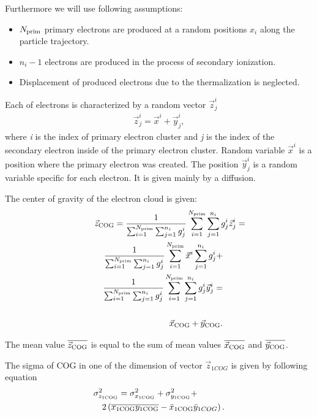 \documentclass[a4paper,12pt]{article}
\begin{document}
Furthermore we will use following  assumptions:
\begin{itemize}
\item $N_{\rm{prim}}$ primary electrons  are produced at a random
positions $x_i$ along the particle trajectory. \item $n_i-1$
electrons are produced in the process of secondary ionization.
\item Displacement of produced electrons due to the thermalization
is neglected.
\end{itemize}

Each of electrons is characterized by a random vector
$\vec{z}^i_j$
\begin{eqnarray}
    \vec{z}^i_j =\vec{x}^i+\vec{y}^i_j,
\label{eqZtot}
\end{eqnarray}
where {\it{i}} is the index of primary electron cluster and
{\it{j}} is the index of the secondary electron inside of the
primary electron cluster. Random variable $\vec{x}^i$ is a
position where the primary electron was created. The position
$\vec{y}^i_j$ is a random variable specific for each electron.  It
is given mainly by a diffusion.

The center of gravity of the electron  cloud is given:
\begin{eqnarray}
    \lefteqn{\vec{z}_{\rm{COG}}=\frac{1}{\sum_{i=1}^{N_{\rm{prim}}}
    \sum_{j=1}^{n_i}{g_j^i}}
    \sum_{i=1}^{N_{\rm{prim}}}\sum_{j=1}^{n_i}{g_j^i\vec{z}_j^i}=}
    \nonumber\\
    &&{}\frac{1}{\sum_{i=1}^{N_{\rm{prim}}}
    \sum_{j=1}^{n_i}{g_j^i}}
    \sum_{i=1}^{N_{\rm{prim}}}\vec{x}^i\sum_{j=1}^{n_i}{g_j^i}+\nonumber\\
    &&{}\frac{1}{\sum_{i=1}^{N_{\rm{prim}}}
    \sum_{j=1}^{n_i}{g_j^i}}
    \sum_{i=1}^{N_{\rm{prim}}}\sum_{j=1}^{n_i}{g_j^i\vec{y}_j^i}=
    \nonumber\\ \nonumber\\
    &&{}
    \vec{x}_{\rm{COG}}+\vec{y}_{\rm{COG}}.
\label{eqCOGSec}
\end{eqnarray}

The mean value $\overline{\vec{z}_{\rm{COG}}}$ is equal to the sum
of mean values $\overline{\vec{x}_{\rm{COG}}}$ and
$\overline{\vec{y}_{\rm{COG}}}$.

The sigma of COG in one of the dimension of vector
$\vec{z}_{1COG}$ is given by following equation
\begin{eqnarray}
    \lefteqn{\sigma_{z_{\rm{1COG}}}^2=\sigma_{x_{\rm{1COG}}}^2+
    \sigma_{y_{\rm{1COG}}}^2+}\nonumber\\
    &&{}
        2\left(\overline{x_{\rm{1COG}}y_{\rm{1COG}}}-\bar{x}_{\rm{1COG}}
        \bar{y}_{1COG}\right).
\label{eqCOGSigSec}
\end{eqnarray}
\end{document}
